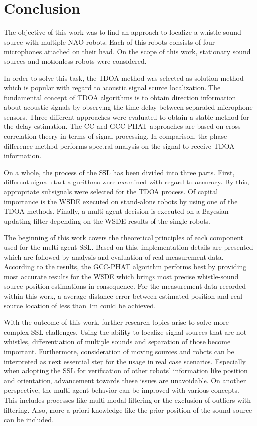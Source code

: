\chapter{Conclusion}
\label{chap:05_conclusion}

The objective of this work was to find an approach to localize a whistle-sound
source with multiple NAO robots.
Each of this robots consists of four microphones attached on their head.
On the scope of this work, stationary sound sources and motionless robots were
considered.

In order to solve this task, the \acf{TDOA} method was selected as solution method
which is popular with regard to acoustic signal source localization.
The fundamental concept of \ac{TDOA} algorithms is to obtain direction information
about acoustic signals by observing the time delay between separated microphone sensors.
Three different approaches were evaluated to obtain a stable method
for the delay estimation.
The \acf{CC} and \acf{GCC-PHAT} approaches are based on cross-correlation theory in terms
of signal processing.
In comparison, the phase difference method performs spectral analysis on the signal
to receive \ac{TDOA} information.

On a whole, the process of the \acf{SSL} has been divided into three parts.
First, different signal start algorithms were examined with regard to accuracy.
By this, appropriate subsignals were selected for the \ac{TDOA} process.
Of capital importance is the \acf{WSDE} executed on stand-alone robots by
using one of the \ac{TDOA} methods.
Finally, a multi-agent decision is executed on a Bayesian updating filter
depending on the \ac{WSDE} results of the single robots.

The beginning of this work covers the theoretical principles of each component
used for the multi-agent \ac{SSL}.
Based on this, implementation details are presented which are followed by analysis
and evaluation of real measurement data.
According to the results, the \acf{GCC-PHAT} algorithm performs best by
providing most accurate results for the \ac{WSDE} which brings most precise
whistle-sound source position estimations in consequence.
For the measurement data recorded within this work, a average
distance error between estimated position and real source location
of less than 1\si{\meter} could be achieved.

With the outcome of this work, further research topics arise to solve
more complex \ac{SSL} challenges.
Using the ability to localize signal sources that are not whistles,
differentiation of multiple sounds and separation of those become important.
Furthermore, consideration of moving sources and robots can be interpreted
as next essential step for the usage in real case scenarios.
Especially when adopting the \ac{SSL} for verification of other robots' information
like position and orientation, advancement towards these issues are unavoidable.
On another perspective, the multi-agent behavior can be improved with various
concepts.
This includes processes like multi-modal filtering or the exclusion of outliers
with filtering.
Also, more a-priori knowledge like the prior position of the sound source can be included.

